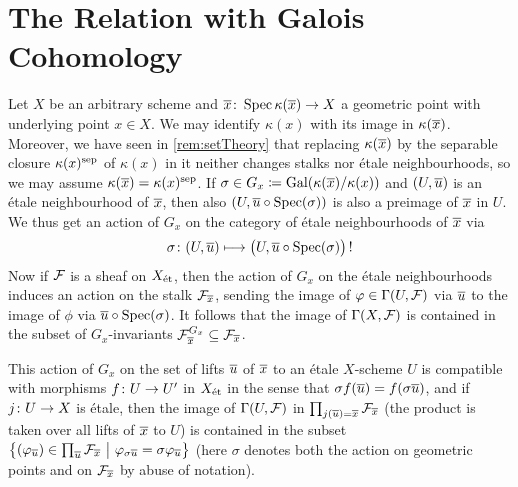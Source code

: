 \section{The Relation with Galois Cohomology}
\begin{rem}\label{rem:GaloisAction}
	Let $X$ be an arbitrary scheme and $\ov{x}\colon \Spec \kappa(\ov{x})\morphism X$ a geometric point with underlying point $x\in X$. We may identify $\kappa(x)$ with its image in $\kappa(\ov{x})$. Moreover, we have seen in \cref{rem:setTheory} that replacing $\kappa(\ov{x})$ by the separable closure $\kappa(x)^{\mathrm{sep}}$ of $\kappa(x)$ in it neither changes stalks nor étale neighbourhoods, so we may assume $\kappa(\ov{x})=\kappa(x)^\sep$. If $\sigma\in G_x\coloneqq \Gal(\kappa(\ov{x})/\kappa(x))$ and $(U,\ov{u})$ is an étale neighbourhood of $\ov{x}$, then also $(U,\ov{u}\circ \Spec(\sigma))$ is also a preimage of $\ov{x}$ in $U$. We thus get an action of $G_x$ on the category of étale neighbourhoods of $\ov{x}$ via
	\begin{equation*}
		\sigma\colon (U,\ov{u})\longmapsto \big(U,\ov{u}\circ \Spec(\sigma)\big)\,!
	\end{equation*}
	Now if $\mathcal{F}$ is a sheaf on $X_{\mathrm{\acute{e}t}}$, then the action of $G_x$ on the étale neighbourhoods induces an action on the stalk $\Ff_{\ov{x}}$, sending the image of $\varphi\in \operatorname{\Gamma}(U,\mathcal{F})$ via $\ov{u}$ to the image of $\phi$ via $\ov{u}\circ \Spec(\sigma)$. It follows that the image of $\operatorname{\Gamma}(X,\mathcal{F})$ is contained in the subset of $G_x$-invariants $\Ff_{\ov{x}}^{G_x}\subseteq \Ff_{\ov{x}}$.
	
	This action of $G_x$ on the set of lifts $\ov{u}$ of $\ov{x}$ to an étale $X$-scheme $U$ is compatible with morphisms $f\colon U\morphism U'$ in $X_{\mathrm{\acute{e}t}}$ in the sense that $\sigma f(\ov{u})=f(\sigma \ov{u})$, and if $j\colon U\morphism X$ is étale, then the image of $\operatorname{\Gamma}(U,\mathcal{F})$ in $\prod_{j(\ov{u})=\ov{x}}\Ff_{\ov{x}}$ (the product is taken over all lifts of $\ov{x}$ to $U$) is contained in the subset $\big\{(\phi_{\ov{u}})\in \prod_{\ov{u}}\Ff_{\ov{x}}\ \big|\ \phi_{\sigma \ov{u}}=\sigma \phi_{\ov{u}}\big\}$ (here $\sigma$ denotes both the action on geometric points and on $\Ff_{\ov{x}}$ by abuse of notation).
\end{rem}

